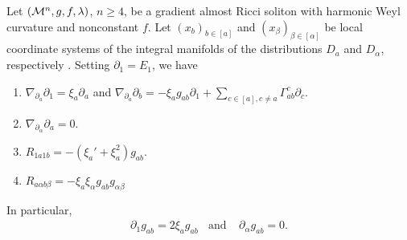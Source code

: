 \begin{lema}\label{lemmamany}
	Let $(\mathcal{M}^n,g,f,\lambda)$, $n\geq4$, be a gradient almost Ricci soliton with harmonic Weyl curvature and nonconstant $f$. Let $(x_{b})_{b\in[a]}$ and $(x_{\beta})_{\beta\in[\alpha]}$ be local coordinate systems of the integral manifolds of the distributions $D_{a}$ and $D_{\alpha}$, respectively . Setting $\partial_{1}=E_{1}$, we have
	\begin{enumerate}
		\item\label{1} $\nabla_{\partial_{a}}{\partial_{1}}=\xi_{a}\partial_{a}$ and $\nabla_{\partial_{a}}\partial_{b}=-\xi_{a}g_{ab}\partial_{1}+\displaystyle\sum_{c\in[a], c\neq a}\Gamma_{ab}^{c}\partial_{c}$.
		\item\label{3} $\nabla_{\partial_{\alpha}}\partial_{a}=0$.
		\item\label{4} $R_{1a1b}=-(\xi_{a}'+\xi_{a}^{2})g_{ab}$.
		\item\label{5} $R_{a\alpha b\beta}=-\xi_{a}\xi_{\alpha}g_{ab}g_{\alpha\beta}$
	\end{enumerate}
	In particular,
	\begin{align}\label{37lemma36}
		 \partial_{1}g_{ab}=2\xi_{a}g_{ab}\ \ \ \ \text{and}\ \ \ \ \ \partial_\alpha g_{ab}=0.
	\end{align}
\end{lema}
